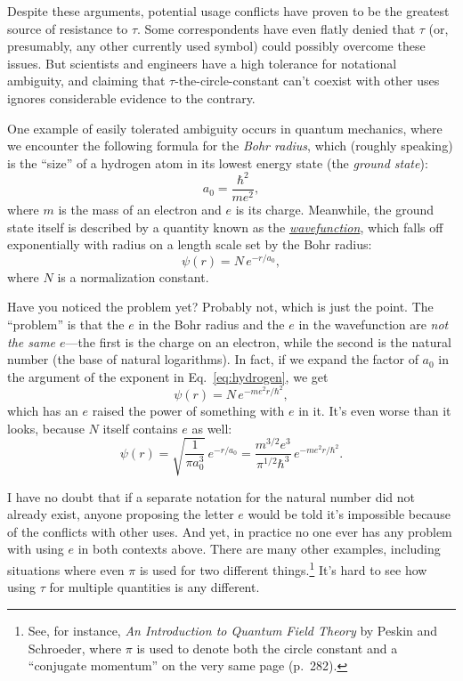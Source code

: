 {Despite these arguments, potential usage conflicts have proven to be the greatest source of resistance to $\tau$. Some correspondents have even flatly denied that $\tau$ (or, presumably, any other currently used symbol) could possibly overcome these issues. But scientists and engineers have a high tolerance for notational ambiguity, and claiming that $\tau$-the-circle-constant can't coexist with other uses ignores considerable evidence to the contrary.

One example of easily tolerated ambiguity occurs in quantum mechanics, where we encounter the following formula for the \emph{Bohr radius}, which (roughly speaking) is the ``size'' of a hydrogen atom in its lowest energy state (the \emph{ground state}):
\[
a_0 = \frac{\hbar^2}{m e^2},
\]
where $m$ is the mass of an electron and $e$ is its charge. Meanwhile, the ground state itself is described by a quantity known as the \href{https://en.wikipedia.org/wiki/Wave_function}{\emph{wavefunction}}, which falls off exponentially with radius on a length scale set by the Bohr radius:
\begin{equation}
\label{eq:hydrogen}
\psi(r) = N\,e^{-r/a_0},
\end{equation}
where $N$ is a normalization constant.

Have you noticed the problem yet? Probably not, which is just the point. The ``problem'' is that the $e$ in the Bohr radius and the $e$ in the wavefunction are \emph{not the same $e$}---the first is the charge on an electron, while the second is the natural number (the base of natural logarithms). In fact, if we expand the factor of $a_0$ in the argument of the exponent in Eq.~\eqref{eq:hydrogen}, we get
\[
\psi(r) = N\,e^{-m e^2 r/\hbar^2},
\]
which has an $e$ raised the power of something with $e$ in it. It's even worse than it looks, because $N$ itself contains $e$ as well:
\[
\psi(r) = \sqrt{\frac{1}{\pi a_0^3}}\,e^{-r/a_0} =
\frac{m^{3/2} e^3}{\pi^{1/2} \hbar^3}\,e^{-m e^2 r/\hbar^2}.
\]

I have no doubt that if a separate notation for the natural number did not already exist, anyone proposing the letter $e$ would be told it's impossible because of the conflicts with other uses. And yet, in practice no one ever has any problem with using $e$ in both contexts above.
There are many other examples, including situations where even $\pi$ is used for two different things.\footnote{See, for instance, \emph{An Introduction to Quantum Field Theory} by Peskin and Schroeder, where $\pi$ is used to denote both the circle constant and a ``conjugate momentum'' on the very same page (p.~282).} It's hard to see how using $\tau$ for multiple quantities is any different.

}

